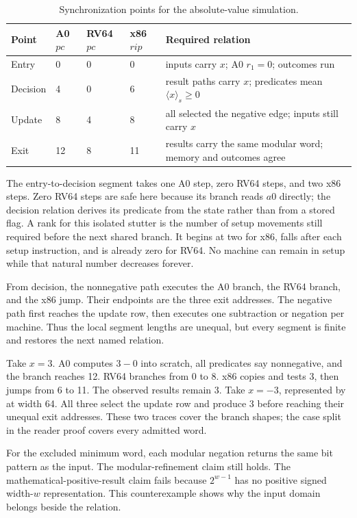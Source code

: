 \begin{table}[htbp]
\centering
\caption{Synchronization points for the absolute-value simulation.}
\label{tab:abs-sync}
\begin{tabular}{@{}p{}p{}p{}p{}p{}@{}}
\toprule
Point & A0 \(pc\) & RV64 \(pc\) & x86 \(rip\) & Required relation \\
\midrule
Entry & 0 & 0 & 0 & inputs carry \(x\); A0 \(r_1=0\); outcomes run \\
Decision & 4 & 0 & 6 & result paths carry \(x\); predicates mean
\(\langle x\rangle_s\geq0\) \\
Update & 8 & 4 & 8 & all selected the negative edge; inputs still carry \(x\) \\
Exit & 12 & 8 & 11 & results carry the same modular word; memory and outcomes agree \\
\bottomrule
\end{tabular}
\end{table}

The entry-to-decision segment takes one A0 step, zero RV64 steps, and two x86
steps. Zero RV64 steps are safe here because its branch reads \(a0\) directly;
the decision relation derives its predicate from the state rather than from a
stored flag. A rank for this isolated stutter is the number of setup movements
still required before the next shared branch. It begins at two for x86, falls
after each setup instruction, and is already zero for RV64. No machine can
remain in setup while that natural number decreases forever.

From decision, the nonnegative path executes the A0 branch, the RV64 branch,
and the x86 jump. Their endpoints are the three exit addresses. The negative
path first reaches the update row, then executes one subtraction or negation
per machine. Thus the local segment lengths are unequal, but every segment is
finite and restores the next named relation.

Take \(x=3\). A0 computes \(3-0\) into scratch, all predicates say
nonnegative, and the branch reaches 12. RV64 branches from 0 to 8. x86 copies
and tests 3, then jumps from 6 to 11. The observed results remain 3. Take
\(x=-3\), represented by  at width 64. All three select
the update row and produce 3 before reaching their unequal exit addresses.
These two traces cover the branch shapes; the case split in the reader proof
covers every admitted word.

For the excluded minimum word, each modular negation returns the same bit
pattern as the input. The modular-refinement claim still holds. The
mathematical-positive-result claim fails because \(2^{w-1}\) has no positive
signed width-\(w\) representation. This counterexample shows why the input
domain belongs beside the relation.

